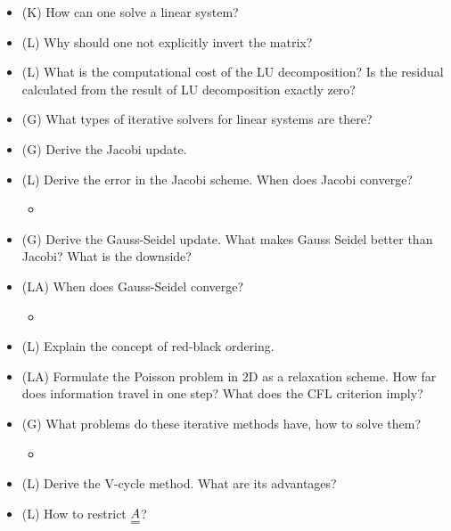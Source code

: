 \begin{itemize}
    \item (K) How can one solve a linear system?
    \answerboxM
    \item (L) Why should one not explicitly invert the matrix?
    \answerboxM
    \item (L) What is the computational cost of the LU decomposition? Is the residual calculated from the result of LU decomposition exactly zero?
    \answerboxM
    \item (G) What types of iterative solvers for linear systems are there?
    \answerboxM
    \item (G) Derive the Jacobi update.
    \answerboxM
    \item (L) Derive the error in the Jacobi scheme. When does Jacobi converge?
    \begin{itemize}
        \item {}
    \end{itemize}
    \answerboxM
    \item (G) Derive the Gauss-Seidel update. What makes Gauss Seidel better than Jacobi? What is the downside?
    \answerboxM
    \item (LA) When does Gauss-Seidel converge?
    \begin{itemize}
        \item {}
    \end{itemize}
    \answerboxS
    \item (L) Explain the concept of red-black ordering.
    \answerboxS
    \item (LA) Formulate the Poisson problem in 2D as
    a relaxation scheme. How far does information travel in one step? What does the CFL criterion imply?
    \answerboxM
    \item (G) What problems do these iterative methods have, how to solve them?
    \begin{itemize}
        \item {}
    \end{itemize}
    \answerboxM
    \item (L) Derive the V-cycle method. What are its advantages?
    \answerboxL
    \item (L) How to restrict $\mat{A}$?

\end{itemize}
